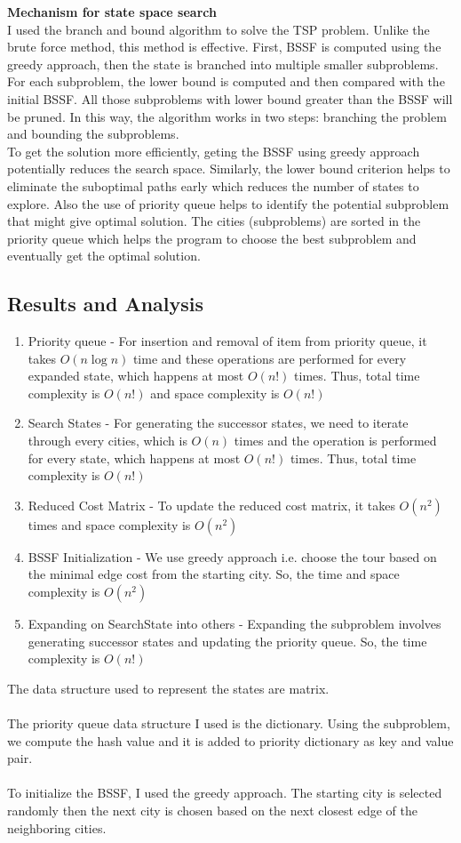 \documentclass[12pt]{article}
\begin{document}
\textbf{Mechanism for state space search}\\
I used the branch and bound algorithm to solve the TSP problem. Unlike the brute force method, this method is effective. First, BSSF is computed using the greedy approach, then the state is branched into multiple smaller subproblems.
For each subproblem, the lower bound is computed and then compared with the initial BSSF. All those subproblems with lower bound greater than the BSSF will be pruned. In this way, the algorithm 
works in two steps: branching the problem and bounding the subproblems. \\
To get the solution more efficiently, geting the BSSF using greedy approach potentially reduces the search space. Similarly, the lower bound criterion helps to eliminate the suboptimal paths early which 
reduces the number of states to explore. Also the use of priority queue helps to identify the potential subproblem that might give optimal solution. The cities (subproblems) are sorted in
 the priority queue which helps the program to choose the best subproblem and eventually get the optimal solution.


\subsection{Results and Analysis}
\begin{enumerate}
    \item Priority queue - For insertion and removal of item from priority queue, it takes $O(n \log n)$ time and these operations are performed for every expanded state, which happens at most $O(n!)$ times. Thus, total time complexity is $O(n!)$ and space complexity is $O(n!)$
    \item Search States - For generating the successor states, we need to iterate through every cities, which is $O(n)$ times and
    the operation is performed for every state, which happens at most $O(n!)$ times. Thus, total time complexity is $O(n!)$ 
    \item Reduced Cost Matrix - To update the reduced cost matrix, it takes $O(n^2)$ times and space complexity is $O(n^2)$
    \item BSSF Initialization - We use greedy approach i.e. choose the tour based on the minimal edge cost from the starting city. So, the time and space complexity is $O(n^2)$
    \item Expanding on SearchState into others - Expanding the subproblem involves generating successor states and updating the priority queue. So, the time complexity is $O(n!)$
\end{enumerate}
\noindent The data structure used to represent the states are matrix. \\ \\
The priority queue data structure I used is the dictionary. Using the subproblem, we compute the hash value and it is added to priority dictionary as key and value pair.\\ \\
To initialize the BSSF, I used the greedy approach. The starting city is selected randomly then the next city is chosen based on the next closest edge of the neighboring cities.
\end{document}

